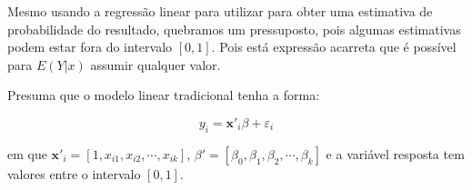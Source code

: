 \documentclass[
	12pt,				%
	openright,			%
	oneside,      %
	a4paper,			%
	english,			%
	french,				%
	spanish,			%
	brazil,				%
	]{abntex2}\usepackage[]{graphicx}\usepackage[table]{xcolor}
\theoremstyle{definition}
\begin{document}

Mesmo usando a regressão linear para utilizar para obter uma estimativa de probabilidade
do resultado, quebramos um pressuposto, pois algumas estimativas podem estar fora do
intervalo $[0,1]$. Pois está expressão acarreta que é possível para $E(Y|x)$ assumir qualquer valor. 

Presuma que o modelo linear tradicional tenha a forma: 

\begin{equation}
  y_{i} = \mathbf{x'}_i \beta + \varepsilon_i
\end{equation}

\noindent em que $\mathbf{x'}_i = [1,x_{i1},x_{i2},\cdots,x_{ik}]$, $\beta' = 
[\beta_0,\beta_1,\beta_2,\cdots,\beta_k]$ e a variável resposta tem valores entre
o intervalo $[0,1]$. 
\end{document}
